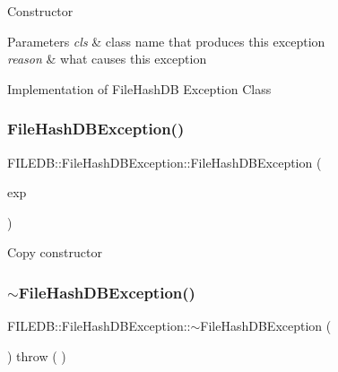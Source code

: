 Constructor 
\begin{DoxyParams}{Parameters}
{\em cls} & class name that produces this exception \\
\hline
{\em reason} & what causes this exception\\
\hline
\end{DoxyParams}
Implementation of File\+Hash\+DB Exception Class \mbox{\label{classFILEDB_1_1FileHashDBException_ad018a7bda0cfd93d2efac5c16c10886e}} 
\subsubsection{\texorpdfstring{FileHashDBException()}{FileHashDBException()}\hspace{0.1cm}{\footnotesize\ttfamily [2/6]}}
{\footnotesize\ttfamily F\+I\+L\+E\+D\+B\+::\+File\+Hash\+D\+B\+Exception\+::\+File\+Hash\+D\+B\+Exception (\begin{DoxyParamCaption}\item[{const \mbox{\hyperlink{classFILEDB_1_1FileHashDBException}{File\+Hash\+D\+B\+Exception}} \&}]{exp }\end{DoxyParamCaption})}

Copy constructor \mbox{\label{classFILEDB_1_1FileHashDBException_af163ad5163826f561cd5f997efff6287}} 
\subsubsection{\texorpdfstring{$\sim$FileHashDBException()}{~FileHashDBException()}\hspace{0.1cm}{\footnotesize\ttfamily [1/2]}}
{\footnotesize\ttfamily F\+I\+L\+E\+D\+B\+::\+File\+Hash\+D\+B\+Exception\+::$\sim$\+File\+Hash\+D\+B\+Exception (\begin{DoxyParamCaption}\item[{void}]{ }\end{DoxyParamCaption}) throw ( ) \hspace{0.3cm}{\ttfamily [virtual]}}

